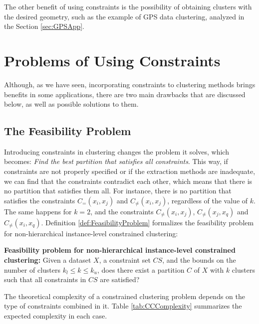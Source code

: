 The other benefit of using constraints is the possibility of obtaining clusters with the desired geometry, such as the example of \acs{GPS} data clustering, analyzed in the Section \ref{sec:GPSApp}.

\section{Problems of Using Constraints} \label{sec:ConstraintsProblems}

Although, as we have seen, incorporating constraints to clustering methods brings benefits in some applications, there are two main drawbacks that are discussed below, as well as possible solutions to them.

\subsection{The Feasibility Problem}

Introducing constraints in clustering changes the problem it solves, which becomes: \textit{Find the best partition that satisfies all constraints}. This way, if constraints are not properly specified or if the extraction methods are inadequate, we can find that the constraints contradict each other, which means that there is no partition that satisfies them all. For instance, there is no partition that satisfies the constraints $C_=(x_i,x_j)$ and $C_{\neq}(x_i,x_j)$, regardless of the value of $k$. The same happens for $k = 2$, and the constraints $C_{\neq}(x_i, x_j)$, $C_{\neq}(x_j, x_q)$ and $C_{\neq}(x_i, x_q)$. Definition \ref{def:FeasibilityProblem} formalizes the feasibility problem for non-hierarchical instance-level constrained clustering:

\begin{definition}
	
	\textbf{Feasibility problem for non-hierarchical instance-level constrained clustering:} Given a dataset $X$, a constraint set $CS$, and the bounds on the number of clusters $k_l \leq k \leq k_u$, does there exist a partition $C$ of $X$ with $k$ clusters such that all constraints in $CS$ are satisfied? \cite{davidson2005clustering,davidson2007survey}
	
	\label{def:FeasibilityProblem}
	
\end{definition}

 The theoretical complexity of a constrained clustering problem depends on the type of constraints combined in it. Table \ref{tab:CCComplexity} summarizes the expected complexity in each case. 

